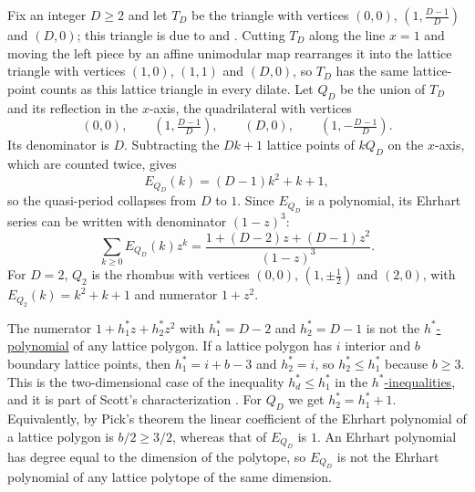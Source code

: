 \begin{example}
Fix an integer $D\geq 2$ and let $T_D$ be the triangle with vertices
$(0,0)$, $(1,\tfrac{D-1}{D})$ and $(D,0)$; this triangle is due to
 and  \cite{McAllister2005}.
Cutting $T_D$ along the line $x=1$ and moving the left piece by an affine
unimodular map rearranges it into the lattice triangle with vertices
$(1,0)$, $(1,1)$ and $(D,0)$, so $T_D$ has the same lattice-point counts as
this lattice triangle in every dilate.
Let $Q_D$ be the union of $T_D$ and its reflection in the $x$-axis, the
quadrilateral with vertices
\[
  (0,0),\qquad \left(1,\tfrac{D-1}{D}\right),\qquad (D,0),\qquad
  \left(1,-\tfrac{D-1}{D}\right).
\]
Its denominator is $D$.  Subtracting the $Dk+1$ lattice points of $kQ_D$ on
the $x$-axis, which are counted twice, gives
\[
  E_{Q_D}(k)=(D-1)k^2+k+1,
\]
so the quasi-period collapses from $D$ to $1$.  Since $E_{Q_D}$ is a
polynomial, its Ehrhart series can be written with denominator $(1-z)^3$:
\[
  \sum_{k\geq 0}E_{Q_D}(k)z^k=\frac{1+(D-2)z+(D-1)z^2}{(1-z)^3}.
\]
For $D=2$, $Q_2$ is the rhombus with vertices $(0,0)$, $(1,\pm\tfrac12)$ and
$(2,0)$, with $E_{Q_2}(k)=k^2+k+1$ and numerator $1+z^2$.

The numerator $1+h^*_1z+h^*_2z^2$ with $h^*_1=D-2$ and $h^*_2=D-1$ is not the
\hyperref[hStarPolynomial]{$h^*$-polynomial} of any lattice polygon.
If a lattice polygon has $i$ interior and $b$ boundary lattice points, then
$h^*_1=i+b-3$ and $h^*_2=i$, so $h^*_2\leq h^*_1$ because $b\geq 3$.
This is the two-dimensional case of the inequality $h^*_d\leq h^*_1$ in the
\hyperref[hStarInequalities]{$h^*$-inequalities}, and it is part of
Scott's characterization \cite{Scott1976ConvexLatticePolygons}.
For $Q_D$ we get $h^*_2=h^*_1+1$.
Equivalently, by Pick's theorem the linear coefficient of the Ehrhart
polynomial of a lattice polygon is $b/2\geq 3/2$, whereas that of $E_{Q_D}$
is $1$.  An Ehrhart polynomial has degree equal to the dimension of the
polytope, so $E_{Q_D}$ is not the Ehrhart polynomial of any lattice polytope
of the same dimension.
\end{example}

